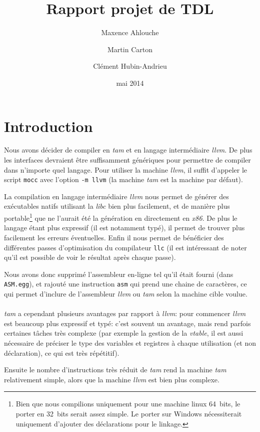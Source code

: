 \documentclass{scrartcl}
\title{Rapport projet de TDL}
\author{Maxence Ahlouche \and Martin Carton \and Clément Hubin-Andrieu}
\date{mai 2014}
\newcommand{\llvm}{\textit{llvm}}
\newcommand{\tam} {\textit{tam}}
\begin{document}
  \maketitle
  \tableofcontents
  \newpage

\section{Introduction}
  Nous avons décider de compiler en \tam{} et en langage intermédiaire \llvm{}.
  De plus les interfaces devraient être suffisamment génériques pour permettre
  de compiler dans n'importe quel langage. Pour utiliser la machine \llvm{}, il
  suffit d'appeler le script \texttt{mocc} avec l'option \verb+-m llvm+ (la
  machine \tam{} est la machine par défaut).

  La compilation en langage intermédiaire \llvm{} nous permet de générer des
  exécutables natifs utilisant la \textit{libc} bien plus facilement, et de
  manière plus portable\footnote{Bien que nous compilions uniquement pour une
  machine linux 64~bits, le porter en 32~bits serait assez simple. Le porter
  sur Windows nécessiterait uniquement d'ajouter des déclarations pour le
  linkage.} que ne l'aurait été la génération en directement en
  \textit{x86}. De plus le langage étant plus expressif (il est notamment typé),
  il permet de trouver plus facilement les erreurs éventuelles. Enfin il nous
  permet de bénéficier des différentes passes d'optimisation du compilateur
  \verb+llc+ (il est intéressant de noter qu'il est possible de voir le
  résultat après chaque passe).

  Nous avons donc supprimé l'assembleur en-ligne tel qu'il était fourni (dans
  \verb+ASM.egg+), et rajouté une instruction \verb+asm+ qui prend une chaine
  de caractères, ce qui permet d'inclure de l'assembleur \llvm{} ou \tam{}
  selon la machine cible voulue.

  \paragraph{}
  \tam{} a cependant plusieurs avantages par rapport à \llvm{}: pour commencer
  \llvm{} est beaucoup plus expressif et typé: c'est souvent un avantage, mais
  rend parfois certaines tâches très complexe (par exemple la gestion de la
  \textit{vtable}, il est aussi nécessaire de préciser le type des variables et
  registres à chaque utilisation (et non déclaration), ce qui est très
  répétitif).

  Ensuite le nombre d'instructions très réduit de \tam{} rend la machine \tam{}
  relativement simple, alors que la machine \llvm{} est bien plus complexe.
\end{document}
